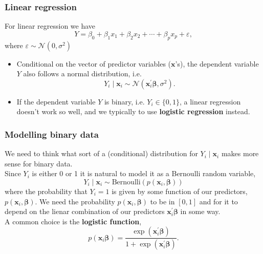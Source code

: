 \documentclass[a4paper]{article}\usepackage[]{graphicx}\usepackage[]{xcolor}
\begin{document}
\subsubsection{Linear regression}
For linear regression we have
\[
	Y = \beta_0 + \beta_1 x_1 + \beta_2 x_2 + \dotsb + \beta_p x_p + \varepsilon,
\]
where \( \varepsilon \sim \mathcal{N}(0,\sigma^2) \)
\begin{itemize}
	\item Conditional on the vector of predictor variables (\( \symbf{x} \)'s), the dependent variable \( Y \) also follows a normal distribution, i.e.
	\[
		Y_i \mid \symbf{x}_i \sim \mathcal{N}(\symbf{x}_i^\prime \symbf{\beta}, \sigma^2).
	\]
	\item If the dependent variable \( Y \) is binary, i.e. \( Y_i \in \{0,1\} \), a linear regression doesn't work so well, and we typically to use \textbf{logistic regression} instead.
\end{itemize}
\subsubsection{Modelling binary data}
We need to think what sort of a (conditional) distribution for \( Y_i \mid \symbf{x}_i \) makes more sense for binary data.\\
Since \( Y_i \) is either 0 or 1 it is natural to model it as a Bernoulli random variable,
\[
	Y_i \mid \symbf{x}_i \sim \mathrm{Bernoulli}(p(\symbf{x}_i,\symbf{\beta}))
\]
where the probability that \( Y_i = 1 \) is given by some function of our predictors, \( p(\symbf{x}_i,\symbf{\beta}) \).
We need the probability \( p(\symbf{x}_i,\symbf{\beta}) \) to be in \( [0,1] \) and for it to depend on the lienar combination of our predictors \( \symbf{x}_i^\prime \symbf{\beta} \) in some way.\\
A common choice is the \textcolor{myred}{\textbf{logistic function}},
\[
	p(\symbf{x}_i \symbf{\beta}) = \frac{\exp(\symbf{x}_i^\prime \symbf{\beta})}{1+\exp(\symbf{x}^\prime_i\symbf{\beta})}.
\]
\end{document}
